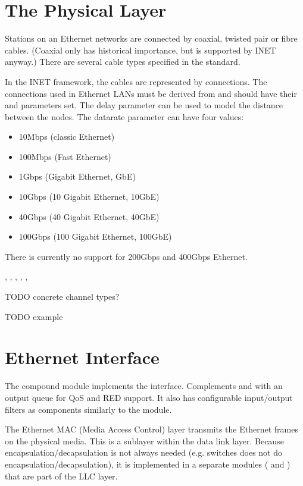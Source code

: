 \section{The Physical Layer}
\label{sec:ethernet:the-physical-layer}

Stations on an Ethernet networks are connected by coaxial,
twisted pair or fibre cables. (Coaxial only has historical importance,
but is supported by INET anyway.) There are several cable types specified
in the standard.

In the INET framework, the cables are represented by connections.
The connections used in Ethernet LANs must be derived from
 and should have their  and
 parameters set.
The delay parameter can be used to model the distance between the
nodes. The datarate parameter can have four values:

\begin{itemize}
  \item 10Mbps (classic Ethernet)
  \item 100Mbps (Fast Ethernet)
  \item 1Gbps (Gigabit Ethernet, GbE)
  \item 10Gbps (10 Gigabit Ethernet, 10GbE)
  \item 40Gbps (40 Gigabit Ethernet, 40GbE)
  \item 100Gbps (100 Gigabit Ethernet, 100GbE)
\end{itemize}

There is currently no support for 200Gbps and 400Gbps Ethernet.

, , , ,
, 

TODO concrete channel types?

TODO example

\section{Ethernet Interface}
\label{sec:ethernet:ethernet-interface}

The  compound module implements the 
interface. Complements  and  with an output queue
for QoS and RED support. It also has configurable input/output filters as 
components similarly to the  module.

The Ethernet MAC (Media Access Control) layer transmits the Ethernet frames on
the physical media. This is a sublayer within the data link layer. Because
encapsulation/decapsulation is not always needed (e.g. switches does not do
encapsulation/decapsulation), it is implemented in a separate modules
( and ) that are part of the LLC layer.


